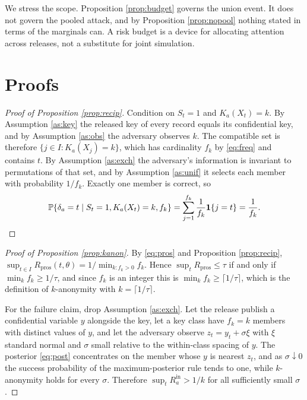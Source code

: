 \documentclass[11pt,a4paper]{article}
\theoremstyle{plain}
\theoremstyle{definition}
\theoremstyle{definition}
\theoremstyle{plain}
\newcommand{\Prob}{\mathbb{P}}
\newcommand{\ind}[1]{\mathbf{1}\{#1\}}
\begin{document}
We stress the scope. Proposition \ref{prop:budget} governs the union event. It
does not govern the pooled attack, and by Proposition \ref{prop:nopool} nothing
stated in terms of the marginals can. A risk budget is a device for allocating
attention across releases, not a substitute for joint simulation.

\section{Proofs}\label{app:proofs}

\begin{proof}[Proof of Proposition \ref{prop:recip}]
Condition on $S_t = 1$ and $K_a(X_t) = k$. By Assumption \ref{as:key} the
released key of every record equals its confidential key, and by Assumption
\ref{as:obs} the adversary observes $k$. The compatible set is therefore
$\{j \in I : K_a(X_j) = k\}$, which has cardinality $f_k$ by \eqref{eq:freq}
and contains $t$. By Assumption \ref{as:exch} the adversary's information is
invariant to permutations of that set, and by Assumption \ref{as:unif} it
selects each member with probability $1/f_k$. Exactly one member is correct,
so
\[
\Prob\{\delta_a = t \mid S_t = 1, K_a(X_t) = k, f_k\}
= \sum_{j=1}^{f_k} \frac{1}{f_k}\ind{j = t} = \frac{1}{f_k} . \qedhere
\]
\end{proof}

\begin{proof}[Proof of Proposition \ref{prop:kanon}]
By \eqref{eq:pros} and Proposition \ref{prop:recip}, $\sup_{t \in I}
R_{\mathrm{pros}}(t,\theta) = 1/\min_{k : f_k > 0} f_k$. Hence $\sup_t
R_{\mathrm{pros}} \leq \tau$ if and only if $\min_k f_k \geq 1/\tau$, and since
$f_k$ is an integer this is $\min_k f_k \geq \lceil 1/\tau \rceil$, which is the
definition of $k$-anonymity with $k = \lceil 1/\tau\rceil$.

For the failure claim, drop Assumption \ref{as:exch}. Let the release publish a confidential
variable $y$ alongside the key, let a key class have $f_k = k$ members with
distinct values of $y$, and let the adversary observe $z_t = y_t + \sigma \xi$ with $\xi$ standard normal and
$\sigma$ small relative to the within-class spacing of $y$. The posterior
\eqref{eq:post} concentrates on the member whose $y$ is nearest $z_t$, and as
$\sigma \downarrow 0$ the success probability of the maximum-posterior rule
tends to one, while $k$-anonymity holds for every $\sigma$. Therefore
$\sup_t R_a^{\mathrm{in}} > 1/k$ for all sufficiently small $\sigma$.
\end{proof}
\end{document}
